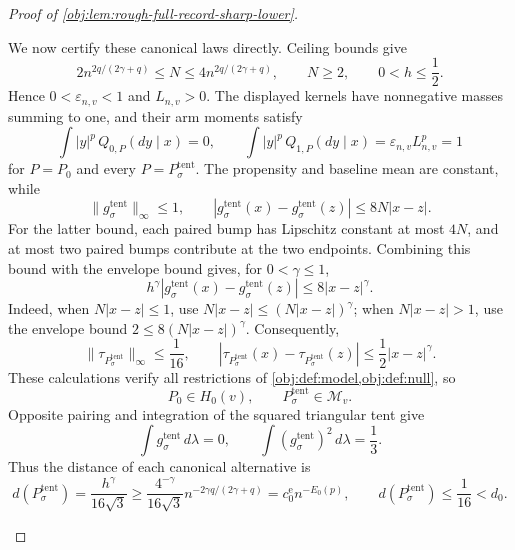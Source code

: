 \documentclass[11pt]{article}
\begin{document}
\begin{proof}[Proof of \cref{obj:lem:rough-full-record-sharp-lower}]
\begin{enumerate}
We now certify these canonical laws directly. Ceiling bounds give
\[
2n^{2q/(2\gamma+q)}\le N\le4n^{2q/(2\gamma+q)},
\qquad N\ge2,
\qquad 0<h\le\frac12.
\]
Hence \(0<\varepsilon_{n,v}<1\) and \(L_{n,v}>0\). The displayed kernels have nonnegative masses summing to one, and their arm moments satisfy
\[
\int |y|^p\,Q_{0,P}(dy\mid x)=0,
\qquad
\int |y|^p\,Q_{1,P}(dy\mid x)
=\varepsilon_{n,v}L_{n,v}^p=1
\]
for \(P=P_0\) and every \(P=P^{\mathrm{tent}}_\sigma\).
The propensity and baseline mean are constant, while
\[
\|g^{\mathrm{tent}}_\sigma\|_\infty\le1,
\qquad
|g^{\mathrm{tent}}_\sigma(x)-g^{\mathrm{tent}}_\sigma(z)|
\le8N|x-z|.
\]
For the latter bound, each paired bump has Lipschitz constant at most \(4N\), and at most two paired bumps contribute at the two endpoints. Combining this bound with the envelope bound gives, for \(0<\gamma\le1\),
\[
h^\gamma
|g^{\mathrm{tent}}_\sigma(x)-g^{\mathrm{tent}}_\sigma(z)|
\le8|x-z|^\gamma.
\]
Indeed, when \(N|x-z|\le1\), use
\(N|x-z|\le(N|x-z|)^\gamma\); when \(N|x-z|>1\), use the envelope bound \(2\le8(N|x-z|)^\gamma\).
Consequently,
\[
\|\tau_{P^{\mathrm{tent}}_\sigma}\|_\infty\le\frac1{16},
\qquad
|\tau_{P^{\mathrm{tent}}_\sigma}(x)
-\tau_{P^{\mathrm{tent}}_\sigma}(z)|
\le\frac12|x-z|^\gamma.
\]
These calculations verify all restrictions of
\cref{obj:def:model,obj:def:null}, so
\[
P_0\in H_0(v),
\qquad P^{\mathrm{tent}}_\sigma\in\mathcal M_v.
\]
Opposite pairing and integration of the squared triangular tent give
\[
\int g^{\mathrm{tent}}_\sigma\,d\lambda=0,
\qquad
\int (g^{\mathrm{tent}}_\sigma)^2\,d\lambda=\frac13.
\]
Thus the distance of each canonical alternative is
\[
d(P^{\mathrm{tent}}_\sigma)
=\frac{h^\gamma}{16\sqrt3}
\ge\frac{4^{-\gamma}}{16\sqrt3}
 n^{-2\gamma q/(2\gamma+q)}
=c_0^{\mathrm e}n^{-E_0(p)},
\qquad
d(P^{\mathrm{tent}}_\sigma)\le\frac1{16}<d_0.
\]


\end{enumerate}
\end{proof}
\end{document}
